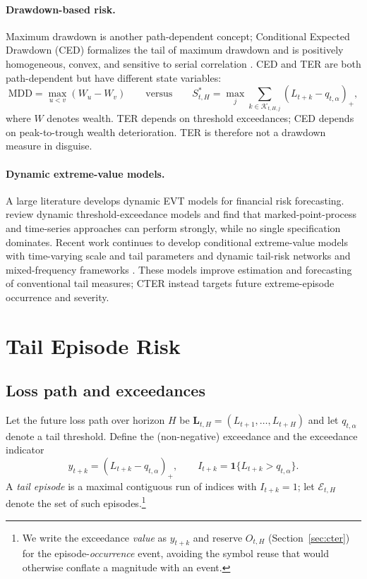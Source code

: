 \documentclass[11pt]{article}
\newcommand{\ind}{\mathbf{1}}
\begin{document}
\paragraph{Drawdown-based risk.} Maximum drawdown is another path-dependent concept; Conditional Expected
Drawdown (CED) formalizes the tail of maximum drawdown and is positively homogeneous, convex, and sensitive
to serial correlation \citep{goldbergmahmoud2017}. CED and TER are both path-dependent but have different
state variables:
\[
\mathrm{MDD}=\max_{u<v}(W_u-W_v)
\qquad\text{versus}\qquad
S^{*}_{t,H}=\max_{j}\sum_{k\in\mathcal K_{t,H,j}}(L_{t+k}-q_{t,\alpha})_+ ,
\]
where $W$ denotes wealth. TER depends on threshold exceedances; CED depends on peak-to-trough wealth
deterioration. TER is therefore not a drawdown measure in disguise.

\paragraph{Dynamic extreme-value models.} A large literature develops dynamic EVT models for financial risk
forecasting. \citet{candiaherrera2024} review dynamic threshold-exceedance models and find that
marked-point-process and time-series approaches can perform strongly, while no single specification
dominates. Recent work continues to develop conditional extreme-value models with time-varying scale and
tail parameters \citep{lihouzhang2026} and dynamic tail-risk networks and mixed-frequency frameworks
\citep{zhangyanshen2026,wang2026jof}. These models improve estimation and forecasting of conventional tail
measures; CTER instead targets future extreme-episode occurrence and severity.

\section{Tail Episode Risk}\label{sec:ter}

\subsection{Loss path and exceedances}
Let the future loss path over horizon $H$ be $\mathbf L_{t,H}=(L_{t+1},\dots,L_{t+H})$ and let $q_{t,\alpha}$
denote a tail threshold. Define the (non-negative) exceedance and the exceedance indicator
\[
y_{t+k}=(L_{t+k}-q_{t,\alpha})_+,\qquad I_{t+k}=\ind\{L_{t+k}>q_{t,\alpha}\}.
\]
A \emph{tail episode} is a maximal contiguous run of indices with $I_{t+k}=1$; let $\mathcal E_{t,H}$ denote
the set of such episodes.\footnote{We write the exceedance \emph{value} as $y_{t+k}$ and reserve
$O_{t,H}$ (Section~\ref{sec:cter}) for the episode-\emph{occurrence} event, avoiding the symbol reuse that
would otherwise conflate a magnitude with an event.}
\end{document}
